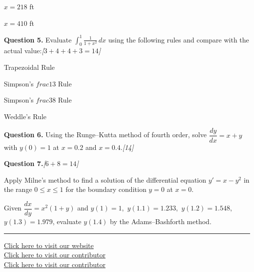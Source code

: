 \documentclass[11pt,a4paper]{article}
\newcommand{\pts}[1]{\hfill   \textit{[#1]}}
\begin{document}
\begin{parts}
  \item $x = 218$ ft
  \item $x = 410$ ft
\end{parts}

\bigskip




\noindent   \textbf{Question 5.} Evaluate $\displaystyle\int_0^1 \frac{1}{1+x^2}\,dx$ using the following rules and compare with the actual value:\pts{$3+4+4+3=14$}

\begin{parts}
  \item Trapezoidal Rule
  \item Simpson's $ frac{1}{3}$ Rule
  \item Simpson's $ frac{3}{8}$ Rule
  \item Weddle's Rule
\end{parts}

\bigskip




\noindent   \textbf{Question 6.} Using the Runge--Kutta method of fourth order, solve $\dfrac{dy}{dx} = x + y$ with $y(0)=1$ at $x = 0.2$ and $x = 0.4$.\pts{14}

\bigskip




\noindent   \textbf{Question 7.}\pts{$6+8=14$}

\begin{parts}
  \item Apply Milne's method to find a solution of the differential equation $y' = x - y^2$ in the range $0 \le x \le 1$ for the boundary condition $y = 0$ at $x = 0$.
  \item Given $\dfrac{dx}{dy} = x^2(1+y)$ and $y(1)=1$,\ $y(1.1)=1.233$,\ $y(1.2)=1.548$,\ $y(1.3)=1.979$, evaluate $y(1.4)$ by the Adams--Bashforth method.
\end{parts}

\vfill
\rule{\linewidth}{0.4pt}

\begin{center}\small
\href{https://bhu-exam.vercel.app/}{Click here to visit our website}\\[4pt]\href{https://me-aryan.vercel.app/}{Click here to visit our contributor}\\[4pt]\href{https://quashan-me.vercel.app/}{Click here to visit our contributor}
\end{center}
\end{document}
